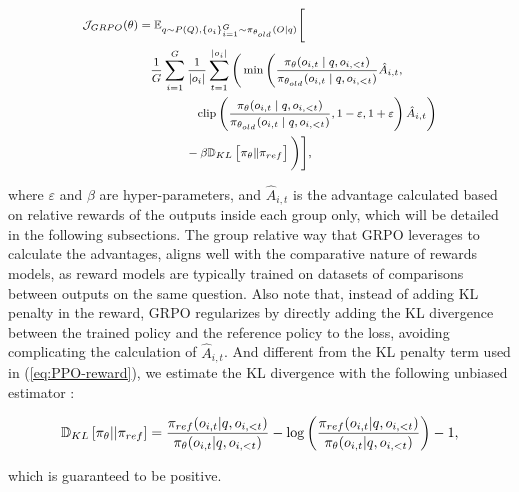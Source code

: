 \begin{itemize}[topsep=0pt]
\begin{itemize}[topsep=0pt]
\begin{equation}
\footnotesize
\begin{split}
    \mathcal{J}_{GRPO}(\theta) &= \mathbb{E}_{q \sim P(Q), \{o_i\}_{i=1}^G \sim \pi_{\theta_{old}}(O|q)} \Bigg[ \\
    & \quad \frac{1}{G} \sum_{i=1}^G \frac{1}{|o_i|} \sum_{t=1}^{|o_i|} \Bigg( \min \Bigg( \frac{\pi_\theta(o_{i,t} \mid q, o_{i,<t})}{\pi_{\theta_{old}}(o_{i,t} \mid q, o_{i,<t})} \hat{A}_{i,t}, \\
    & \quad\quad\quad\quad\quad \text{clip} \left( \frac{\pi_\theta(o_{i,t} \mid q, o_{i,<t})}{\pi_{\theta_{old}}(o_{i,t} \mid q, o_{i,<t})}, 1-\varepsilon, 1+\varepsilon \right) \hat{A}_{i,t} \Bigg) \\
    & \quad\quad\quad\quad - \beta \mathbb{D}_{KL}\left[\pi_{\theta} \Vert \pi_{ref}\right] \Bigg) \Bigg],
\end{split}
\label{eq:GRPO-obj}
\end{equation}

where $\varepsilon$ and $\beta$ are hyper-parameters, and $\hat{A}_{i,t}$  is the advantage calculated based on relative rewards of the outputs inside each group only, which will be detailed in the following subsections. The group relative way that GRPO leverages to calculate the advantages, aligns well with the comparative nature of rewards models,  as reward models are typically trained on datasets of comparisons between outputs on the same question. Also note that, instead of adding KL penalty in the reward, GRPO regularizes by directly adding the KL divergence between the trained policy and the reference policy to the loss, avoiding complicating the calculation of  $\hat{A}_{i,t}$. And different from the KL penalty term used in (\ref{eq:PPO-reward}), we estimate the KL divergence with the following unbiased estimator \citep{kl_approx}:

\begin{equation}
\small
    \mathbb{D}_{KL}\left[\pi_{\theta} || \pi_{ref}\right] = \frac{\pi_{ref}(o_{i,t}|q,o_{i,<t})}{\pi_{\theta}(o_{i,t}|q,o_{i,<t})} - \log\left(\frac{\pi_{ref}(o_{i,t}|q,o_{i,<t})}{\pi_{\theta}(o_{i,t}|q,o_{i,<t})}\right) - 1,
\end{equation}

which is guaranteed to be positive.


\end{itemize}
\end{itemize}
